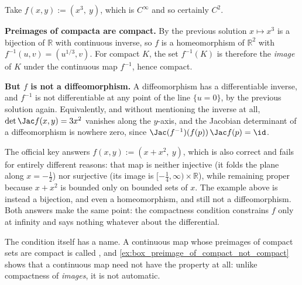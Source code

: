 \begin{exercisesolution}
\label{sol:box_proper_map_not_diffeomorphism}
Take $f(x,y) := (x^3,\ y)$, which is $C^\infty$ and so certainly $C^2$.

\textbf{Preimages of compacta are compact.} By the previous solution $x \mapsto x^3$ is a
bijection of $\mathbb{R}$ with continuous inverse, so $f$ is a homeomorphism of $\mathbb{R}^2$
with $f^{-1}(u,v) = (u^{1/3},v)$. For compact $K$, the set $f^{-1}(K)$ is therefore the
\emph{image} of $K$ under the continuous map $f^{-1}$, hence compact.

\textbf{But $f$ is not a diffeomorphism.} A diffeomorphism has a differentiable inverse, and
$f^{-1}$ is not differentiable at any point of the line $\{u = 0\}$, by the previous solution
again. Equivalently, and without mentioning the inverse at all,
$\det\Jac f(x,y) = 3x^2$ vanishes along the $y$-axis, and the Jacobian determinant of a
diffeomorphism is nowhere zero, since $\Jac(f^{-1})(f(p))\,\Jac f(p) = \id$.

\begin{remark}
The official key answers $f(x,y) := (x+x^2,\ y)$, which is also correct and fails for entirely
different reasons: that map is neither injective (it folds the plane along $x = -\tfrac12$) nor
surjective (its image is $[-\tfrac14,\infty)\times\mathbb{R}$), while remaining proper because
$x + x^2$ is bounded only on bounded sets of $x$. The example above is instead a bijection, and
even a homeomorphism, and still not a diffeomorphism. Both answers make the same point: the
compactness condition constrains $f$ only at infinity and says nothing whatever about the
differential.

The condition itself has a name. A continuous map whose preimages of compact sets are compact is
called , and \cref{ex:box_preimage_of_compact_not_compact} shows that a
continuous map need not have the property at all: unlike compactness of \emph{images}, it is not
automatic.
\end{remark}
\end{exercisesolution}

